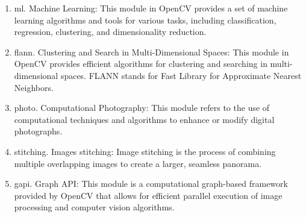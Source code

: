\begin{enumerate}
     \item ml. Machine Learning: This module in OpenCV provides a set of machine learning algorithms and tools for various tasks, including classification, regression, clustering, and dimensionality reduction.
     \item flann. Clustering and Search in Multi-Dimensional Spaces: This module in OpenCV provides efficient algorithms for clustering and searching in multi-dimensional spaces. FLANN stands for Fast Library for Approximate Nearest Neighbors. 
     \item photo. Computational Photography: This module refers to the use of computational techniques and algorithms to enhance or modify digital photographs. 
     \item stitching. Images stitching: Image stitching is the process of combining multiple overlapping images to create a larger, seamless panorama. 
     \item gapi. Graph API: This module is a computational graph-based framework provided by OpenCV that allows for efficient parallel execution of image processing and computer vision algorithms. 
 \end{enumerate}
